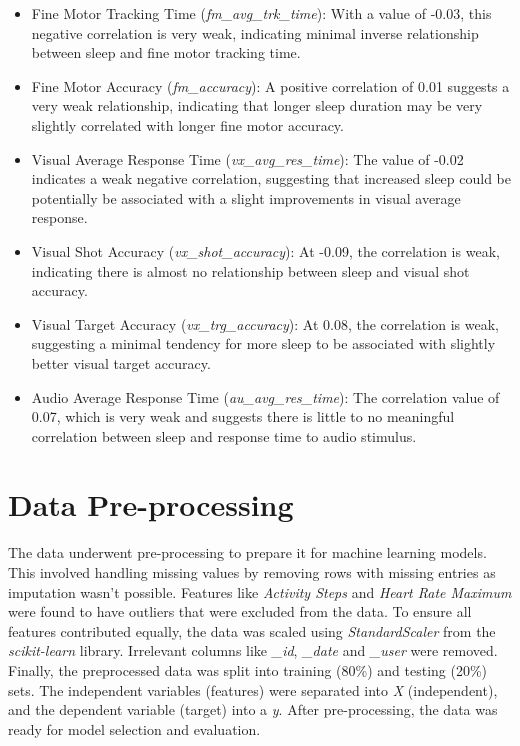 \begin{itemize}
    \item Fine Motor Tracking Time (\textit{fm\_avg\_trk\_time}): With a value of -0.03, this negative correlation is very weak, indicating minimal inverse relationship between sleep
          and fine motor tracking time.

    \item Fine Motor Accuracy (\textit{fm\_accuracy}): A positive correlation of 0.01 suggests a very weak relationship, indicating that longer sleep duration
          may be very slightly correlated with longer fine motor accuracy.

    \item Visual Average Response Time (\textit{vx\_avg\_res\_time}): The value of -0.02 indicates a weak negative correlation, suggesting that increased sleep could be potentially be
          associated with a slight improvements in visual average response.

    \item Visual Shot Accuracy (\textit{vx\_shot\_accuracy}): At -0.09, the correlation is weak, indicating there is almost no relationship between sleep and visual shot accuracy.

    \item Visual Target Accuracy (\textit{vx\_trg\_accuracy}): At 0.08, the correlation is weak, suggesting a minimal tendency for more sleep to be associated with slightly
          better visual target accuracy.

    \item Audio Average Response Time (\textit{au\_avg\_res\_time}): The correlation value of 0.07, which is very weak and suggests there is little to no meaningful correlation between
          sleep and response time to audio stimulus.

\end{itemize}


\section{Data Pre-processing}
The data underwent pre-processing to prepare it for machine learning models. This involved handling missing values by removing rows with missing entries as imputation wasn't possible.
Features like \textit{Activity Steps} and \textit{Heart Rate Maximum} were found to have outliers that were excluded from the data.
To ensure all features contributed equally, the data was scaled using \textit{StandardScaler} from the \textit{scikit-learn} library. Irrelevant columns like \textit{\_id}, \textit{\_date} and
\textit{\_user} were removed. Finally, the preprocessed data was split into training (80\%) and testing (20\%) sets. The independent variables (features) were separated into
\textit{X} (independent), and the dependent variable (target) into a \textit{y}. After pre-processing, the data was ready for model selection and evaluation.



